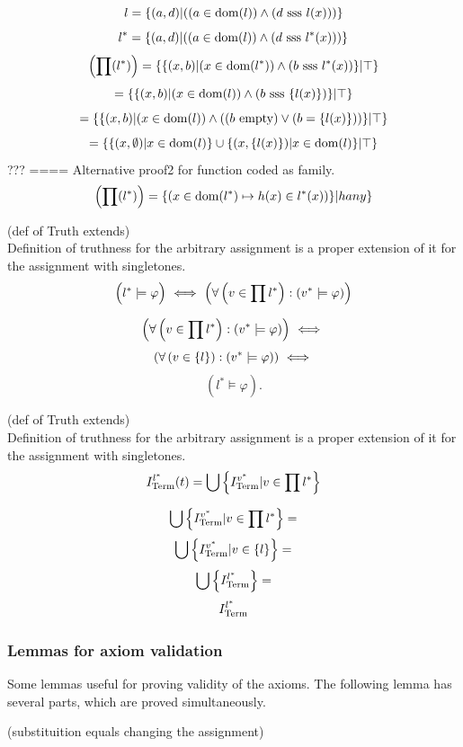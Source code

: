 \[
l=\{(a,d)|((a\in\mathrm{dom}(l))\land (d \mbox{ sss } l(x)))\}
\]
\[
l^*=\{(a,d)|((a\in\mathrm{dom}(l))\land (d \mbox{ sss } l^*(x)))\}
\]
\[
\left(\prod (l^*)\right)=
\{\{(x,b)|(x\in \mathrm{dom}(l^*)) \land (b \mbox{ sss } l^*(x))\}|\top\}
\]
\[
=\{\{(x,b)|(x\in \mathrm{dom}(l)) \land (b \mbox{ sss } \{l(x)\})\}|\top\}
\]
\[
=\{\{(x,b)|(x\in \mathrm{dom}(l)) \land ((b\mathrm{\ empty})\lor(b=\{l(x)\}))\}|\top\}
\]
\[
=\{\{(x,\emptyset)|x\in\mathrm{dom}(l)\}\cup\{(x,\{l(x)\})|x\in\mathrm{dom}(l)\}|\top\}
\]
???
==== Alternative proof2 for function coded as family.
\[
\left(\prod (l^*)\right)=
\{(x\in \mathrm{dom}(l^*) \mapsto h(x) \in l^*(x))\}| h any\}
\]
\fi
\Done
\begin{theorem}(def of Truth extends)\\
Definition of truthness for the arbitrary assignment is a proper extension of it for the assignment with singletones.
\[
\left(l^*\models\varphi\vphantom\prod\right)\IFF
\left(\forall \left(v\in\prod l^*\right):
\left(v^*\models\varphi\right)\right)
\]
\end{theorem}
\Proof
\[
\left(\forall \left(v\in\prod l^*\right):
\left(v^*\models\varphi\right)\right)\ \Longleftrightarrow\ 
\]
\[
\left(\forall \left(v\in\{l\}\right):
\left(v^*\models\varphi\right)\right)\ \Longleftrightarrow\ 
\]
\[
\left(l^*\models\varphi\right).
\]
\Done
\begin{theorem}(def of Truth extends)\\
Definition of truthness for the arbitrary assignment is a proper extension of it for the assignment with singletones.
\[
I^{l^*}_{\mathrm{Term}}(t)=
\bigcup \left\{ I^{v^*}_{\mathrm{Term}} 
|v\in\prod l^*\right\}
\]
\end{theorem}
\Proof
\[
\bigcup \left\{ I^{v^*}_{\mathrm{Term}} 
|v\in\prod l^*\right\}=
\]
\[
\bigcup \left\{ I^{v^*}_{\mathrm{Term}} 
|v\in\{l\}\right\}=
\]
\[
\bigcup \left\{ I^{l^*}_{\mathrm{Term}}\right\}=
\]
\[
I^{l^*}_{\mathrm{Term}}
\]
\Done

\subsubsection{Lemmas for axiom validation}
Some lemmas useful for proving validity of the axioms. The following lemma has several parts, which are proved simultaneously.\\
\begin{lemma}(substituition equals changing the assignment)
\end{lemma}
